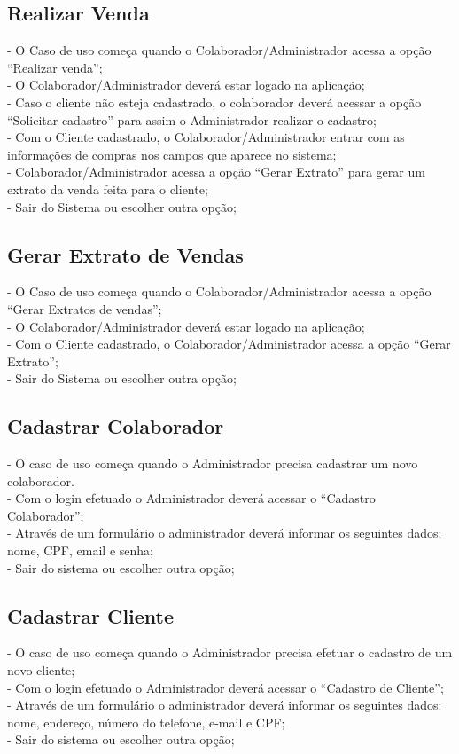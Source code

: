 \documentclass[12pt]{report}
\begin{document}
\subsection{Realizar Venda}
- O Caso de uso começa quando o Colaborador/Administrador acessa a opção “Realizar venda”;\\
- O Colaborador/Administrador deverá estar logado na aplicação;\\
- Caso o cliente não esteja cadastrado, o colaborador deverá acessar a opção
“Solicitar cadastro” para assim o Administrador realizar o cadastro;\\
- Com o Cliente cadastrado, o Colaborador/Administrador entrar com as
informações de compras nos campos que aparece no sistema;\\
- Colaborador/Administrador acessa a opção “Gerar Extrato” para gerar um
extrato da venda feita para o cliente;\\
- Sair do Sistema ou escolher outra opção;\\

\subsection{Gerar Extrato de Vendas}
- O Caso de uso começa quando o Colaborador/Administrador acessa a opção “Gerar Extratos de vendas”;\\
- O Colaborador/Administrador deverá estar logado na aplicação;\\
- Com o Cliente cadastrado, o Colaborador/Administrador acessa a opção “Gerar Extrato”;\\
- Sair do Sistema ou escolher outra opção;\\

\subsection{Cadastrar Colaborador}
- O caso de uso começa quando o Administrador precisa cadastrar um novo colaborador.\\
- Com o login efetuado o Administrador deverá acessar o “Cadastro Colaborador”;\\
- Através de um formulário o administrador deverá informar os seguintes dados:
nome, CPF, email e senha;\\
- Sair do sistema ou escolher outra opção;\\

\subsection{Cadastrar Cliente}
- O caso de uso começa quando o Administrador precisa efetuar o cadastro de um novo cliente;\\
- Com o login efetuado o Administrador deverá acessar o “Cadastro de Cliente”;\\
- Através de um formulário o administrador deverá informar os seguintes dados:\\
nome, endereço, número do telefone, e-mail e CPF;\\
- Sair do sistema ou escolher outra opção;\\
\end{document}

